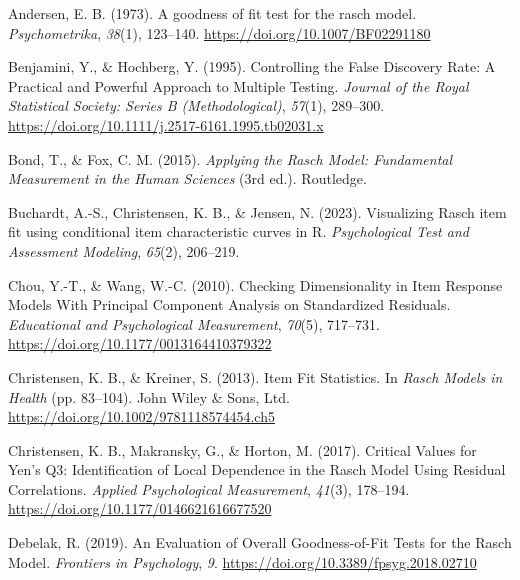 \documentclass[
  letterpaper,
  DIV=11,
  numbers=noendperiod]{scrartcl}
\newlength{\cslhangindent}
\newenvironment{CSLReferences}[2] %
 {\begin{list}{}{%
  \setlength{\itemindent}{0pt}
  \setlength{\leftmargin}{0pt}
  \setlength{\parsep}{0pt}
  \ifodd #1
   \setlength{\leftmargin}{\cslhangindent}
   \setlength{\itemindent}{-1\cslhangindent}
  \fi
  \setlength{\itemsep}{#2\baselineskip}}}
 {\end{list}}
\begin{document}
\label{refs}
\begin{CSLReferences}{1}{0}
Andersen, E. B. (1973). A goodness of fit test for the rasch model.
\emph{Psychometrika}, \emph{38}(1), 123--140.
\url{https://doi.org/10.1007/BF02291180}

Benjamini, Y., \& Hochberg, Y. (1995). Controlling the {False}
{Discovery} {Rate}: {A} {Practical} and {Powerful} {Approach} to
{Multiple} {Testing}. \emph{Journal of the Royal Statistical Society:
Series B (Methodological)}, \emph{57}(1), 289--300.
\url{https://doi.org/10.1111/j.2517-6161.1995.tb02031.x}

Bond, T., \& Fox, C. M. (2015). \emph{Applying the {Rasch} {Model}:
{Fundamental} {Measurement} in the {Human} {Sciences}} (3rd ed.).
Routledge.

Buchardt, A.-S., Christensen, K. B., \& Jensen, N. (2023). Visualizing
{Rasch} item fit using conditional item characteristic curves in {R}.
\emph{Psychological Test and Assessment Modeling}, \emph{65}(2),
206--219.

Chou, Y.-T., \& Wang, W.-C. (2010). Checking {Dimensionality} in {Item}
{Response} {Models} {With} {Principal} {Component} {Analysis} on
{Standardized} {Residuals}. \emph{Educational and Psychological
Measurement}, \emph{70}(5), 717--731.
\url{https://doi.org/10.1177/0013164410379322}

Christensen, K. B., \& Kreiner, S. (2013). Item {Fit} {Statistics}. In
\emph{Rasch {Models} in {Health}} (pp. 83--104). John Wiley \& Sons,
Ltd. \url{https://doi.org/10.1002/9781118574454.ch5}

Christensen, K. B., Makransky, G., \& Horton, M. (2017). Critical
{Values} for {Yen}'s {Q3}: {Identification} of {Local} {Dependence} in
the {Rasch} {Model} {Using} {Residual} {Correlations}. \emph{Applied
Psychological Measurement}, \emph{41}(3), 178--194.
\url{https://doi.org/10.1177/0146621616677520}

Debelak, R. (2019). An {Evaluation} of {Overall} {Goodness}-of-{Fit}
{Tests} for the {Rasch} {Model}. \emph{Frontiers in Psychology},
\emph{9}. \url{https://doi.org/10.3389/fpsyg.2018.02710}


\end{CSLReferences}
\end{document}
